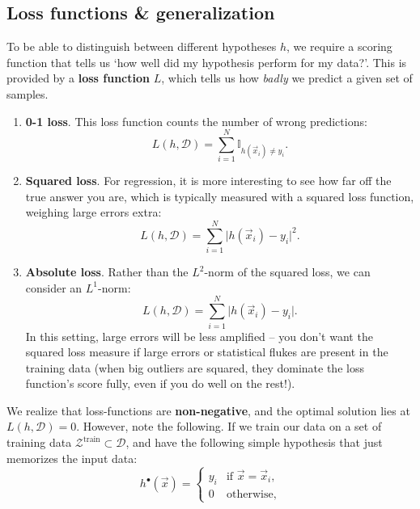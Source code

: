 \documentclass{article}
\begin{document}
\subsection{Loss functions \& generalization}
To be able to distinguish between different hypotheses $h$, we require a scoring function that tells us `how well did my hypothesis perform for my data?'. This is provided by a \textbf{loss function} $L$, which tells us how \textit{badly} we predict a given set of samples.
\begin{spexample}
    \begin{enumerate}\itemsep0em
        \item \textbf{0-1 loss}. This loss function counts the number of wrong predictions:
        \begin{equation}
            L(h,\mathcal{D}) = \sum_{i=1}^N \mathbb{I}_{h(\vec{x}_i)\neq y_i}.
        \end{equation}
        \item \textbf{Squared loss}. For regression, it is more interesting to see how far off the true answer you are, which is typically measured with a squared loss function, weighing large errors extra:
        \begin{equation}
            L(h,\mathcal{D}) = \sum_{i=1}^N \lvert h(\vec{x}_i)-y_i \rvert^2.
        \end{equation}
        \item \textbf{Absolute loss}. Rather than the $L^2$-norm of the squared loss, we can consider an $L^1$-norm:
        \begin{equation}
            L(h,\mathcal{D}) = \sum_{i=1}^N \lvert h(\vec{x}_i)-y_i\rvert.
        \end{equation}
        In this setting, large errors will be less amplified -- you don't want the squared loss measure if large errors or statistical flukes are present in the training data (when big outliers are squared, they dominate the loss function's score fully, even if you do well on the rest!).
    \end{enumerate}
\end{spexample}
{\flushleft We} realize that loss-functions are \textbf{non-negative}, and the optimal solution lies at $L(h,\mathcal{D})=0$. However, note the following. If we train our data on a set of training data $\mathcal{Z}^\text{train}\subset\mathcal{D}$, and have the following simple hypothesis that just memorizes the input data:
\begin{equation}
    h^\bullet(\vec{x}) = \begin{cases} y_i & \text{if }\vec{x}=\vec{x}_i, \\ 0 & \text{otherwise}, \end{cases}
\end{equation}
\end{document}
